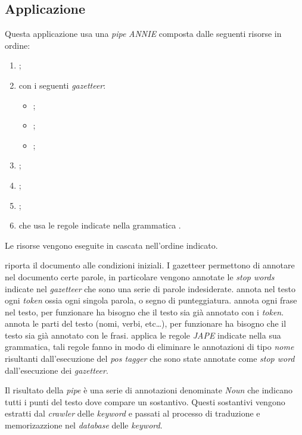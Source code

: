 \documentclass[tesi.tex]{subfiles}
\begin{document}
\subsection{Applicazione }
Questa applicazione usa una \emph{pipe} \emph{ANNIE} composta dalle
seguenti risorse in ordine:
\begin{enumerate}
\item {};
\item {} con i seguenti \emph{gazetteer}:
  \begin{itemize}
  \item {};
  \item {};
  \item {};
  \end{itemize}
\item {}; 
\item {};
\item {};
\item {} che usa le regole indicate nella
  grammatica .
\end{enumerate}

Le risorse vengono eseguite in cascata nell'ordine indicato.

 riporta il documento alle condizioni iniziali.
I gazetteer permettono di annotare nel documento certe parole, in
particolare vengono annotate le \emph{stop words} indicate nel
\emph{gazetteer}  che sono una serie di
parole indesiderate.
 annota nel testo ogni \emph{token} ossia ogni
singola parola, o segno di punteggiatura.
 annota ogni frase nel testo, per funzionare
ha bisogno che il testo sia gi\`a annotato con i \emph{token}.
 annota le parti del testo (nomi, verbi, etc\dots),
per funzionare ha bisogno che il testo sia gi\`a annotato con le
frasi.  applica le regole \emph{JAPE} indicate
nella sua grammatica, tali regole fanno in modo di eliminare le
annotazioni di tipo \emph{nome} risultanti dall'esecuzione del
\emph{pos tagger} che sono state annotate come \emph{stop word}
dall'esecuzione dei \emph{gazetteer}.

Il risultato della \emph{pipe} \`e una serie di annotazioni
denominate \emph{Noun} che indicano tutti i punti del testo dove
compare un sostantivo. Questi sostantivi vengono estratti dal
\emph{crawler} delle \emph{keyword} e passati al processo di
traduzione e memorizazzione nel \emph{database} delle \emph{keyword}.
\end{document}
